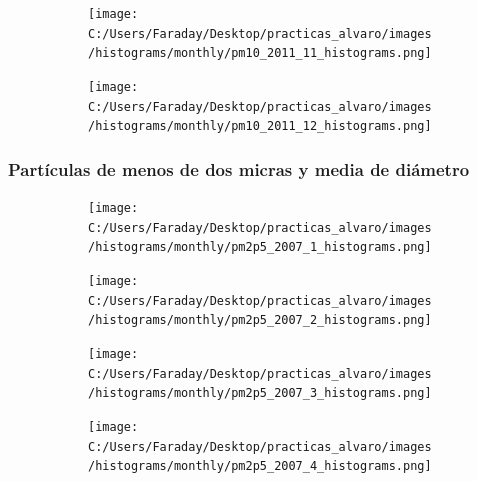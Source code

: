\documentclass[12pt]{article}
\begin{document}
\begin{figure}[H]
\centering
\begin{subfigure}[h]{0.45\textwidth}
\texttt{[image: C:/Users/Faraday/Desktop/practicas\_alvaro/images/histograms/monthly/pm10\_2011\_11\_histograms.png]}
\caption{}
\label{fig:hist-mon-3-11-2011}
\end{subfigure}
%
\begin{subfigure}[H]{0.45\textwidth}
\texttt{[image: C:/Users/Faraday/Desktop/practicas\_alvaro/images/histograms/monthly/pm10\_2011\_12\_histograms.png]}
\caption{}
\label{fig:hist-mon-3-12-2011}
\end{subfigure}
\caption{}
\end{figure}

\newpage

\subsubsection*{Partículas de menos de dos micras y media de diámetro}
%

\begin{figure}[H]
\centering
\begin{subfigure}[h]{0.45\textwidth}
\texttt{[image: C:/Users/Faraday/Desktop/practicas\_alvaro/images/histograms/monthly/pm2p5\_2007\_1\_histograms.png]}
\caption{}
\label{fig:hist-mon-4-1-2007}
\end{subfigure}
%
\begin{subfigure}[H]{0.45\textwidth}
\texttt{[image: C:/Users/Faraday/Desktop/practicas\_alvaro/images/histograms/monthly/pm2p5\_2007\_2\_histograms.png]}
\caption{}
\label{fig:hist-mon-4-2-2007}
\end{subfigure}
\caption{}
\end{figure}

\begin{figure}[H]
\centering
\begin{subfigure}[h]{0.45\textwidth}
\texttt{[image: C:/Users/Faraday/Desktop/practicas\_alvaro/images/histograms/monthly/pm2p5\_2007\_3\_histograms.png]}
\caption{}
\label{fig:hist-mon-4-3-2007}
\end{subfigure}
%
\begin{subfigure}[H]{0.45\textwidth}
\texttt{[image: C:/Users/Faraday/Desktop/practicas\_alvaro/images/histograms/monthly/pm2p5\_2007\_4\_histograms.png]}
\caption{}
\label{fig:hist-mon-4-4-2007}
\end{subfigure}
\caption{}
\end{figure}
\end{document}
